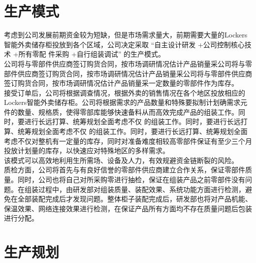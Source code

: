 \documentclass[violet]{main}
\begin{document}
		\section{生产模式}
			考虑到公司发展前期资金较为短缺，但是市场需求量大，前期需要大量的Lockers智能外卖储存柜投放到各个区域，公司决定采取 “自主设计研发 +公司控制核心技术 +所有零配 件采购 +自行组装调试” 的生产模式。
			\\\indent 公司将与零部件供应商签订购货合同，按市场调研情况估计产品销量采公司将与零部件供应商签订购货合同，按市场调研情况估计产品销量采公司将与零部件供应商签订购货合同，按市场调研情况估计产品销量采一定数量的零部件作为库存。
			\\\indent 接受订单后，公司将根据调查情况，根据外卖的销售情况在各个地区投放相应的Lockers智能外卖储存柜。公司将根据需求的产品数量和特殊要拟制计划确需求元件的数量、规格质，使得零部库能够快速备料从而高效完成产品的组装工作。同时，要进行长远打算、统筹规划全面考虑不仅 的组装工作。同时，要进行长远打算、统筹规划全面考虑不仅 的组装工作。同时，要进行长远打算、统筹规划全面考虑不仅对整机有一定量的库存，同时对准备难度相较高零部件保证有至少三个月投放计划量的库存，以快速应对特殊地区的多样需求。
			\\\indent 该模式可以高效地利用生所需场、设备及人力，有效规避资金链断裂的风险。
			\\\indent 质检方面，公司将首先与有良好信誉的零部件供应商建立合作关系，保证零部件质量。同时，公司也将自己对所采购零进行抽检，保证在组装产品之前零部件没有问题。在组装过程中，由研发部对组装质量、装配效果、系统功能方面进行检测，避免在全部装配完成后才发现问题。整体柜子装配完成后，研发部也将对产品机能、保温效果、网络连接效果进行检测，在保证产品所有方面均不存在质量问题后包装进行分配。
		\section{生产规划}
\end{document}
